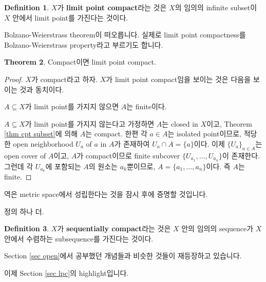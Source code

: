 \documentclass[12pt]{article}
\theoremstyle{definition}
\newtheorem{thm}{Theorem}[section]
\newtheorem{defn}[thm]{Definition}
\begin{document}
	\begin{defn}
		\(X\)가 \textbf{limit point compact}라는 것은 \(X\)의 임의의 infinite subset이 \(X\) 안에서 limit point를 가진다는 것이다.
	\end{defn}

Bolzano-Weierstrass theorem이 떠오릅니다. 실제로 limit point compactness를 Bolzano-Weierstrass property라고 부르기도 합니다.

	\begin{thm}
		Compact이면 limit point compact.
	\end{thm}
	\begin{proof}
		\(X\)가 compact라고 하자. \(X\)가 limit point compact임을 보이는 것은 다음을 보이는 것과 동치이다.
		\begin{center}
			\(A \subseteq X\)가 limit point를 가지지 않으면 \(A\)는 finite이다.
		\end{center}
		\(A \subseteq X\)가 limit point를 가지지 않는다고 가정하면 \(A\)는 closed in \(X\)이고, Theorem \ref{thm cpt subset}에 의해 \(A\)는 compact. 한편 각 \(a \in A\)는 isolated point이므로, 적당한 open neighborhood \(U_a\) of \(a\) in \(A\)가 존재하여 \(U_a \cap  A= \{a\}\)이다. 이제 \(\{U_a\}_{a \in A}\)는 open cover of \(A\)이고, \(A\)가 compact이므로 finite subcover \(\{U_{a_1}, \ldots, U_{a_n}\}\)이 존재한다. 그런데 각 \(U_{a_k}\)에 포함되는 \(A\)의 원소는 \(a_k\)뿐이므로, \(A = \{a_1, \ldots, a_n\}\)이다. 즉 \(A\)는 finite.
	\end{proof}

역은 metric space에서 성립한다는 것을 잠시 후에 증명할 것입니다.

정의 하나 더.

	\begin{defn}
		\(X\)가 \textbf{sequentially compact}라는 것은 \(X\) 안의 임의의 sequence가 \(X\) 안에서 수렴하는 subsequence를 가진다는 것이다.
	\end{defn}

Section \ref{sec open}에서 공부했던 개념들과 비슷한 것들이 재등장하고 있습니다.

이제 Section \ref{sec lpc}의 highlight입니다.
\end{document}
